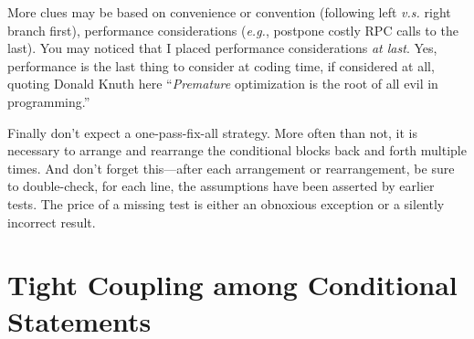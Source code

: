 More clues may be based on convenience or convention (following left \textit{v.s.}
right branch first), performance considerations (\textit{e.g.}, postpone costly RPC calls to the
last).
You may noticed that I placed performance considerations \emph{at last}.
Yes, performance is the last thing to consider at coding time, if considered at all,
quoting Donald Knuth here ``\emph{Premature} optimization is the root of all evil in programming.''


Finally don't expect a one-pass-fix-all strategy.
More often than not, it is necessary to arrange and rearrange the conditional blocks back and forth
multiple times.
And don't forget this---after each arrangement or rearrangement, be sure to
double-check, for each line, the assumptions have been asserted by earlier tests.
The price of a missing test is either an obnoxious exception or a silently incorrect result.









\section{Tight Coupling among Conditional Statements}\label{sec:tightcoupling}


